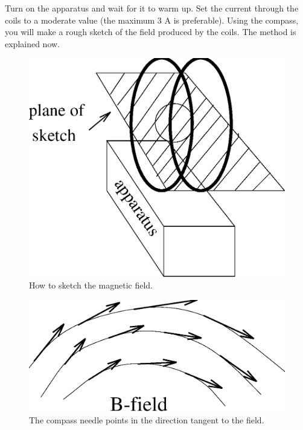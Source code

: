 \noindent Turn on the apparatus and wait for it to warm up.  Set the current 
through the coils to a moderate value (the maximum 3 A is preferable).  Using
the compass, you will make a rough sketch of the field produced by the coils.
The method is explained now.  
\begin{figure}[htb]
\centering \epsfxsize=5cm \includegraphics[scale=0.5]{3_electrondynamics/sketch.eps} 
\caption{How to sketch the magnetic field.} 
\label{fig:ed:sketch}
\end{figure}

\begin{figure}[htb]
\centering \epsfxsize=5cm \includegraphics[scale=0.5]{3_electrondynamics/bfield.eps}
\caption{The compass needle points in the direction tangent to the field.}
\label{fig:ed:bfield}
\end{figure}

